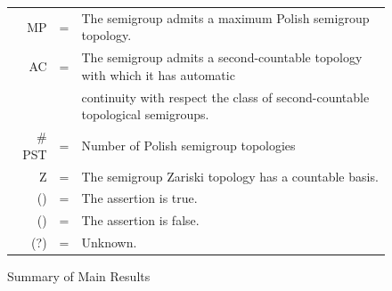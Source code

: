 \documentclass[11pt]{amsart}
\newcommand{\cmark}{\ding{51}}%
\newcommand{\xmark}{\ding{55}}%
\newtheorem{proposition}[theorem]{Proposition}
\theoremstyle{definition}
\begin{document}
\begin{figure}
\begin{tabular}{rcl}
      MP & = & The semigroup admits a maximum Polish semigroup topology.\\ 
    AC & = & The semigroup admits a second-countable topology with which it has automatic \\
    &&continuity with respect the class of second-countable topological semigroups.\\%
    \# PST  & = & Number of Polish semigroup topologies \\
    Z       & = & The semigroup Zariski topology has a countable basis. \\
       (\cmark) &=& The assertion is true. \\
       (\xmark) &=& The assertion is false.\\
    (?) &=& Unknown.
\end{tabular}

\caption{Summary of Main Results}
\label{table-the-only}
\end{figure}








\end{document}
